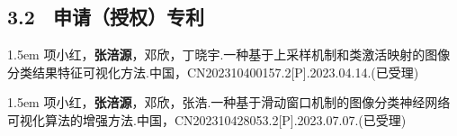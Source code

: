 \subsection{3.2 \ 申请（授权）专利}

\hangindent 1.5em
\noindent
[1]项小红，\textbf{张涪源}，邓欣，丁晓宇.一种基于上采样机制和类激活映射的图像分类结果特征可视化方法.中国，CN202310400157.2[P].2023.04.14.(已受理)

\hangindent 1.5em
\noindent
[2] 项小红，\textbf{张涪源}，邓欣，张浩.一种基于滑动窗口机制的图像分类神经网络可视化算法的增强方法.中国，CN202310428053.2[P].2023.07.07.(已受理)








